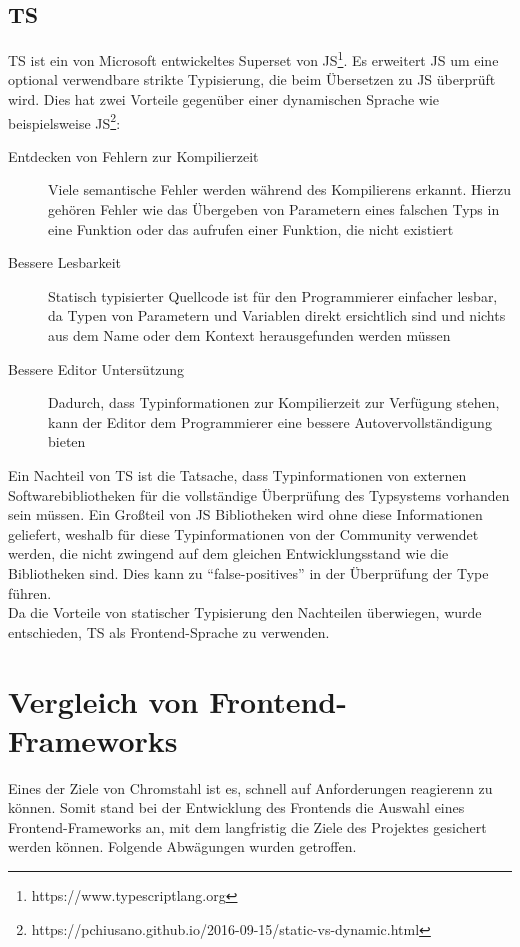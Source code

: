\subsection{\acl{TS}}
\ac{TS} ist ein von Microsoft entwickeltes Superset von
\acl{JS}\footnote{https://www.typescriptlang.org}. Es erweitert \ac{JS} um eine
optional verwendbare strikte Typisierung, die beim Übersetzen zu \ac{JS}
überprüft wird. Dies hat zwei Vorteile gegenüber einer dynamischen Sprache wie
beispielsweise \acl{JS}\footnote{https://pchiusano.github.io/2016-09-15/static-vs-dynamic.html}:
\begin{description}
  \item[Entdecken von Fehlern zur Kompilierzeit]{Viele semantische Fehler werden
    während des Kompilierens erkannt. Hierzu gehören Fehler wie das Übergeben
    von Parametern eines falschen Typs in eine Funktion oder das aufrufen einer
    Funktion, die nicht existiert}
  \item[Bessere Lesbarkeit]{Statisch typisierter Quellcode ist für den
      Programmierer einfacher lesbar, da Typen von Parametern und Variablen
      direkt ersichtlich sind und nichts aus dem Name oder dem Kontext
      herausgefunden werden müssen}
  \item[Bessere Editor Untersützung]{Dadurch, dass Typinformationen zur
      Kompilierzeit zur Verfügung stehen, kann der Editor dem Programmierer eine
      bessere Autovervollständigung bieten}
\end{description}
Ein Nachteil von \acl{TS} ist die Tatsache, dass Typinformationen von externen
Softwarebibliotheken für die vollständige Überprüfung des Typsystems
vorhanden sein müssen. Ein Großteil von \ac{JS} Bibliotheken wird ohne diese
Informationen geliefert, weshalb für diese Typinformationen von der Community
verwendet werden, die nicht zwingend auf dem gleichen Entwicklungsstand wie die
Bibliotheken sind. Dies kann zu ``false-positives'' in der Überprüfung der Type führen.\\
Da die Vorteile von statischer Typisierung den Nachteilen überwiegen, wurde
entschieden, \acl{TS} als Frontend-Sprache zu verwenden.
\section{Vergleich von Frontend-Frameworks}
Eines der Ziele von Chromstahl ist es, schnell auf Anforderungen reagierenn zu
können. Somit stand bei der Entwicklung des Frontends die Auswahl eines
Frontend-Frameworks an, mit dem langfristig die Ziele des Projektes gesichert
werden können. Folgende Abwägungen wurden getroffen.

